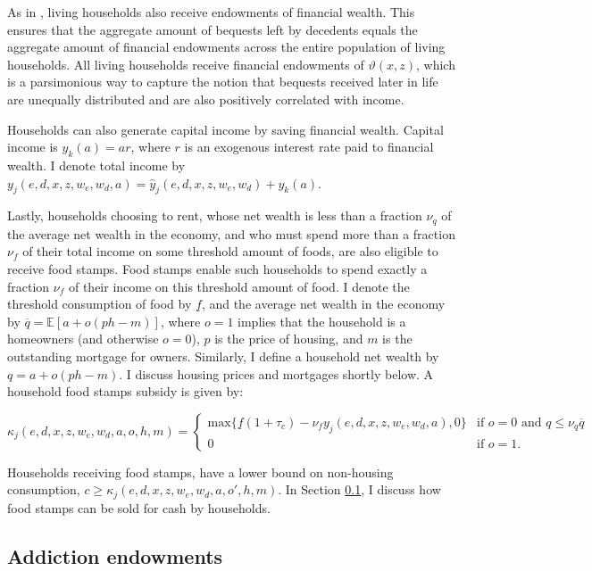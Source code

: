 \documentclass[parskip=full]{article}
\begin{document}
As in \citet{kkk-2021}, living households also receive endowments of financial wealth. This ensures that the aggregate amount of bequests left by decedents equals the aggregate amount of financial endowments across the entire population of living households. All living households receive financial endowments of $\vartheta (x,z)$, which is a parsimonious way to capture the notion that bequests received later in life are unequally distributed and are also positively correlated with income.

Households can also generate capital income by saving financial wealth. Capital income is $y_{k}(a)=ar$, where $r$ is an exogenous interest rate paid to financial wealth. I denote total income by $y_{j}(e,d,x,z,w_{e},w_{d},a)=\hat{y}_{j}(e,d,x,z,w_{e},w_{d})+y_{k}(a)$.

Lastly, households choosing to rent, whose net wealth is less than a fraction $\nu_{q}$ of the average net wealth in the economy, and who must spend more than a fraction $\nu_{f}$ of their total income on some threshold amount of foods, are also eligible to receive food stamps. Food stamps enable such households to spend exactly a fraction $\nu_{f}$ of their income on this threshold amount of food. I denote the threshold consumption of food by $\underline{f}$, and the average net wealth in the economy by $\overline{q}=\mathbb{E}[a+o (ph-m)]$, where $o=1$ implies that the household is a homeowners (and otherwise $o=0$), $p$ is the price of housing, and $m$ is the outstanding mortgage for owners. Similarly, I define a household net wealth by $q=a+o(ph-m)$. I discuss housing prices and mortgages shortly below. A household food stamps subsidy is given by:

\begin{equation}
\kappa_{j}(e,d,x,z,w_{e},w_{d},a,o,h,m)=\begin{cases}
\mbox{max}\{\underline{f}(1+\tau_{c})-\nu_{f}y_{j}(e,d,x,z,w_{e},w_{d},a),0\}&\text{if $o=0$ and $q \leq \nu_{q}\overline{q}$} \\
0 &\text{if $o=1$}.
\end{cases}
\end{equation}

\noindent Households receiving food stamps, have a lower bound on non-housing consumption, $c\geq \kappa_{j}(e,d,x,z,w_{e},w_{d},a,o',h,m)$. In Section \ref{sec:addiction_endowments}, I discuss how food stamps can be sold for cash by households.

\subsection{Addiction endowments}\label{sec:addiction_endowments}
\end{document}

